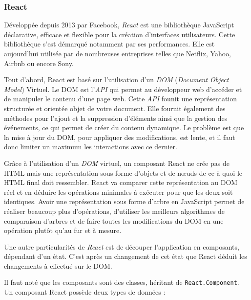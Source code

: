 \documentclass[12pt,a4paper]{article}
\begin{document}
  \bigskip

  \subsubsection{React}\label{react}

  \bigskip

  Développée depuis 2013 par Facebook, \emph{React} est une bibliothèque
  JavaScript déclarative, efficace et flexible pour la création
  d'interfaces utilisateurs. Cette bibliothèque s'est démarqué notamment
  par ses performances. Elle est aujourd'hui utilisée par de nombreuses
  entreprises telles que Netflix, Yahoo, Airbnb ou encore Sony.

  \bigskip

  Tout d'abord, React est basé sur l'utilisation d'un \emph{DOM}
  (\emph{Document Object Model}) Virtuel. Le DOM est l'\emph{API} qui
  permet au développeur web d'accéder et de manipuler le contenu d'une
  page web. Cette \emph{API} founit une représentation structurée et
  orientée objet de votre document. Elle fournit également des méthodes
  pour l'ajout et la suppression d'éléments ainsi que la gestion des
  événements, ce qui permet de créer du contenu dynamique. Le problème est
  que la mise à jour du DOM, pour appliquer des modifications, est lente,
  et il faut donc limiter un maximum les interactions avec ce dernier.

  \bigskip

  Grâce à l'utilisation d'un \emph{DOM} virtuel, un composant React ne
  crée pas de HTML mais une représentation sous forme d'objets et de nœuds
  de ce à quoi le HTML final doit ressembler. React va comparer cette
  représentation au DOM réel et en déduire les opérations minimales à
  exécuter pour que les deux soit identiques. Avoir une représentation
  sous forme d'arbre en JavaScript permet de réaliser beaucoup plus
  d'opérations, d'utiliser les meilleurs algorithmes de comparaison
  d'arbres et de faire toutes les modifications du DOM en une opération
  plutôt qu'au fur et à mesure.

  \bigskip

  Une autre particularités de \emph{React} est de découper l'application
  en composants, dépendant d'un état. C'est après un changement de cet
  état que React déduit les changements à effectué sur le DOM.

  \bigskip

  Il faut noté que les composants sont des classes, héritant de
  \texttt{React.Component}. Un composant React possède deux types de
  données :
\end{document}
